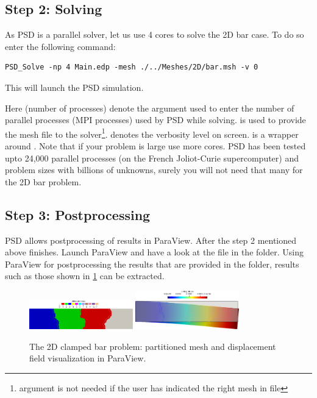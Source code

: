 \subsection{Step 2: Solving}

As PSD is a parallel solver, let us use 4 cores to solve the 2D bar
case. To do so enter the following command:

\begin{lstlisting}[style=BashInputStyle]
PSD_Solve -np 4 Main.edp -mesh ./../Meshes/2D/bar.msh -v 0
\end{lstlisting}

This will launch the PSD simulation.

Here  (number of processes) denote the argument used to enter
the number of parallel processes (MPI processes) used by PSD while
solving.  is used to provide the mesh
file to the
solver\footnote{  argument is not needed if the user has indicated the right mesh in  file}.
 denotes the verbosity level on screen.  is a
wrapper around . Note that if your problem is large
use more cores. PSD has been tested upto 24,000 parallel processes (on
the French Joliot-Curie supercomputer) and problem sizes with billions
of unknowns, surely you will not need that many for the 2D bar problem.

\subsection{Step 3: Postprocessing}

PSD allows postprocessing of results in ParaView. After the step 2
mentioned above finishes. Launch ParaView and have a look at the
 file in the  folder. Using ParaView for
postprocessing the results that are provided in the 
folder, results such as those shown in \cref{bar-le-full-1} can be
extracted.

\begin{figure}[h!]
\centering
\includegraphics[align=t,width=0.4\textwidth]{./Images/le-2d-bar-partioned.png}\hfill
\includegraphics[align=t,width=0.4\textwidth]{./Images/le-2d-bar-results.png}
\caption{The 2D clamped bar problem: partitioned mesh and displacement field visualization in ParaView. \label{bar-le-full-1}}
\end{figure}

